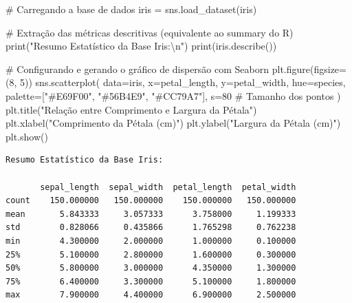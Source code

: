 \documentclass[
  brazilian,
  letterpaper,
  DIV=11,
  numbers=noendperiod]{scrreprt}
\newenvironment{Shaded}{\begin{snugshade}}{\end{snugshade}}
\newcommand{\BuiltInTok}[1]{\textcolor[rgb]{0.00,0.23,0.31}{#1}}
\newcommand{\CharTok}[1]{\textcolor[rgb]{0.13,0.47,0.30}{#1}}
\newcommand{\CommentTok}[1]{\textcolor[rgb]{0.37,0.37,0.37}{#1}}
\newcommand{\DecValTok}[1]{\textcolor[rgb]{0.68,0.00,0.00}{#1}}
\newcommand{\NormalTok}[1]{\textcolor[rgb]{0.00,0.23,0.31}{#1}}
\newcommand{\OperatorTok}[1]{\textcolor[rgb]{0.37,0.37,0.37}{#1}}
\newcommand{\StringTok}[1]{\textcolor[rgb]{0.13,0.47,0.30}{#1}}
\begin{document}
\begin{Shaded}
\begin{Highlighting}[]
\CommentTok{\# Carregando a base de dados}
\NormalTok{iris }\OperatorTok{=}\NormalTok{ sns.load\_dataset(}\StringTok{\textquotesingle{}iris\textquotesingle{}}\NormalTok{)}

\CommentTok{\# Extração das métricas descritivas (equivalente ao summary do R)}
\BuiltInTok{print}\NormalTok{(}\StringTok{"Resumo Estatístico da Base Iris:}\CharTok{\textbackslash{}n}\StringTok{"}\NormalTok{)}
\BuiltInTok{print}\NormalTok{(iris.describe())}

\CommentTok{\# Configurando e gerando o gráfico de dispersão com Seaborn}
\NormalTok{plt.figure(figsize}\OperatorTok{=}\NormalTok{(}\DecValTok{8}\NormalTok{, }\DecValTok{5}\NormalTok{))}
\NormalTok{sns.scatterplot(}
\NormalTok{    data}\OperatorTok{=}\NormalTok{iris, }
\NormalTok{    x}\OperatorTok{=}\StringTok{\textquotesingle{}petal\_length\textquotesingle{}}\NormalTok{, }
\NormalTok{    y}\OperatorTok{=}\StringTok{\textquotesingle{}petal\_width\textquotesingle{}}\NormalTok{, }
\NormalTok{    hue}\OperatorTok{=}\StringTok{\textquotesingle{}species\textquotesingle{}}\NormalTok{, }
\NormalTok{    palette}\OperatorTok{=}\NormalTok{[}\StringTok{"\#E69F00"}\NormalTok{, }\StringTok{"\#56B4E9"}\NormalTok{, }\StringTok{"\#CC79A7"}\NormalTok{],}
\NormalTok{    s}\OperatorTok{=}\DecValTok{80} \CommentTok{\# Tamanho dos pontos}
\NormalTok{)}
\NormalTok{plt.title(}\StringTok{"Relação entre Comprimento e Largura da Pétala"}\NormalTok{)}
\NormalTok{plt.xlabel(}\StringTok{"Comprimento da Pétala (cm)"}\NormalTok{)}
\NormalTok{plt.ylabel(}\StringTok{"Largura da Pétala (cm)"}\NormalTok{)}
\NormalTok{plt.show()}
\end{Highlighting}
\end{Shaded}

\begin{verbatim}
Resumo Estatístico da Base Iris:

       sepal_length  sepal_width  petal_length  petal_width
count    150.000000   150.000000    150.000000   150.000000
mean       5.843333     3.057333      3.758000     1.199333
std        0.828066     0.435866      1.765298     0.762238
min        4.300000     2.000000      1.000000     0.100000
25%        5.100000     2.800000      1.600000     0.300000
50%        5.800000     3.000000      4.350000     1.300000
75%        6.400000     3.300000      5.100000     1.800000
max        7.900000     4.400000      6.900000     2.500000
\end{verbatim}
\end{document}
